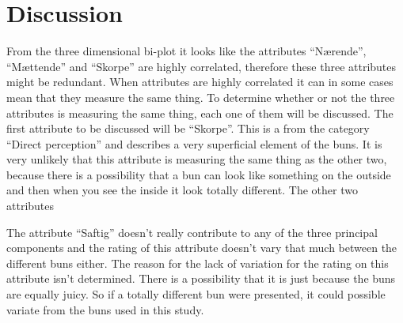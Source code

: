 \section*{Discussion}
\label{discussion}
%
From the three dimensional bi-plot it looks like the attributes “Nærende”, “Mættende” and “Skorpe” are highly correlated, therefore these three attributes might be redundant. 
When attributes are highly correlated it can in some cases mean that they measure the same thing. To determine whether or not the three attributes is measuring the same thing, each one of them will be discussed. \blankline
%
The first attribute to be discussed will be ``Skorpe''. This is a from the category ``Direct perception'' and describes a very superficial element of the buns. It is very unlikely that this attribute is measuring the same thing as the other two, because there is a possibility that a bun can look like something on the outside and then when you see the inside it look totally different. \blankline
%
The other two attributes 
\blankline

The attribute ``Saftig'' doesn't really contribute to any of the three principal components and the rating of this attribute doesn't vary that much between the different buns either. The reason for the lack of variation for the rating on this attribute isn't determined. There is a possibility that it is just because the buns are equally juicy. So if a totally different bun were presented, it could possible variate from the buns used in this study. 